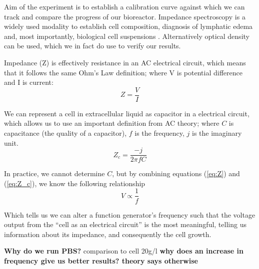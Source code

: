 

Aim of the experiment is to establish a calibration curve against which we can track and compare the progress of our bioreactor.
Impedance spectroscopy is a widely used modality to establish cell composition, diagnosis of lymphatic edema and, most importantly, biological cell suspensions \cite{LvovichVadimF2012Is, PolatAyfer2017EDoL}.
Alternatively optical density can be used, which we in fact do use to verify our results.

Impedance (Z) is effectively resistance in an AC electrical circuit, which means that it follows the same Ohm's Law definition; where V is potential difference and I is current:
\begin{equation} \label{eq:Z}
    Z = \frac{V}{I}
\end{equation}

We can represent a cell in extracellular liquid as capacitor in a electrical circuit, which allows us to use an important definition from AC theory; where $C$ is capacitance (the quality of a capacitor), $f$ is the frequency, $j$ is the imaginary unit.
\begin{equation} \label{eq:Z_c}
    Z_c = \frac{-j}{2\pi f C}
\end{equation}

In practice, we cannot determine $C$, but by combining equations (\ref{eq:Z}) and (\ref{eq:Z_c}), we know the following relationship
\begin{equation}
   V \propto \frac{1}{f}
\end{equation}

Which tells us we can alter a function generator's frequency such that the voltage output from the ``cell as an electrical circuit'' is the most meaningful, telling us information about its impedance, and consequently the cell growth.

\textbf{Why do we run PBS?} comparison to cell 20g/l
\textbf{why does an increase in frequency give us better results? theory says otherwise}